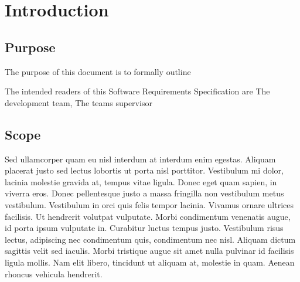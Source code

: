 
\chapter{Introduction} %

\label{Part2Chapter1} %




\section{Purpose}

The purpose of this document is to formally outline 

The intended readers of this Software Requirements Specification are The development team, The teams supervisor 


\section{Scope}

Sed ullamcorper quam eu nisl interdum at interdum enim egestas. Aliquam placerat justo sed lectus lobortis ut porta nisl porttitor. Vestibulum mi dolor, lacinia molestie gravida at, tempus vitae ligula. Donec eget quam sapien, in viverra eros. Donec pellentesque justo a massa fringilla non vestibulum metus vestibulum. Vestibulum in orci quis felis tempor lacinia. Vivamus ornare ultrices facilisis. Ut hendrerit volutpat vulputate. Morbi condimentum venenatis augue, id porta ipsum vulputate in. Curabitur luctus tempus justo. Vestibulum risus lectus, adipiscing nec condimentum quis, condimentum nec nisl. Aliquam dictum sagittis velit sed iaculis. Morbi tristique augue sit amet nulla pulvinar id facilisis ligula mollis. Nam elit libero, tincidunt ut aliquam at, molestie in quam. Aenean rhoncus vehicula hendrerit.

